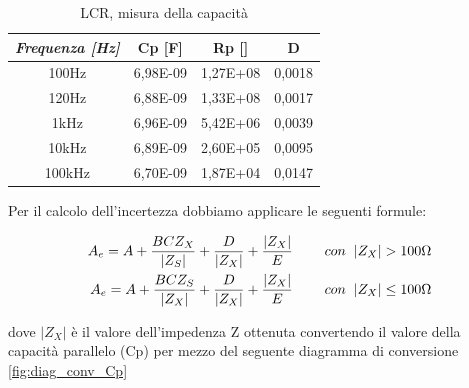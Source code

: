 \begin{table}[ht]
\centering
\begin{tabular}{|c|c|c|c|}
\hline 
\textit{\textbf{Frequenza [Hz]}} & \textbf{Cp [F]} & \textbf{Rp [\bm{$\Omega$}]} & \textbf{D}  \\ \hline
100Hz                       & 6,98E-09    & 1,27E+08     & 0,0018     \\ \hline
120Hz                       & 6,88E-09    & 1,33E+08     & 0,0017      \\ \hline
1kHz                        & 6,96E-09    & 5,42E+06     & 0,0039      \\ \hline
10kHz                       & 6,89E-09    & 2,60E+05     & 0,0095      \\ \hline
100kHz                      & 6,70E-09    & 1,87E+04     & 0,0147      \\ \hline
\end{tabular}%
\caption{LCR, misura della capacità}
\label{tab:lcr_c}
\end{table}
\FloatBarrier

Per il calcolo dell’incertezza dobbiamo applicare le seguenti formule:

\begin{equation}
\begin{split}
        A_e = A + \frac{BCZ_X}{|Z_S|} + \frac{D}{|Z_X|} + \frac{|Z_X|}{E} \hspace{0,8cm} con \hspace{0,2cm} |Z_X| > 100\Omega \\
        A_e = A + \frac{BCZ_S}{|Z_X|} + \frac{D}{|Z_X|} + \frac{|Z_X|}{E} \hspace{0,8cm} con \hspace{0,2cm} |Z_X| \leq 100\Omega
\end{split}
\end{equation}

dove $|Z_X|$ è il valore dell'impedenza Z ottenuta convertendo il valore della capacità parallelo (Cp) per mezzo del seguente diagramma di conversione \ref{fig:diag_conv_Cp}
\clearpage

